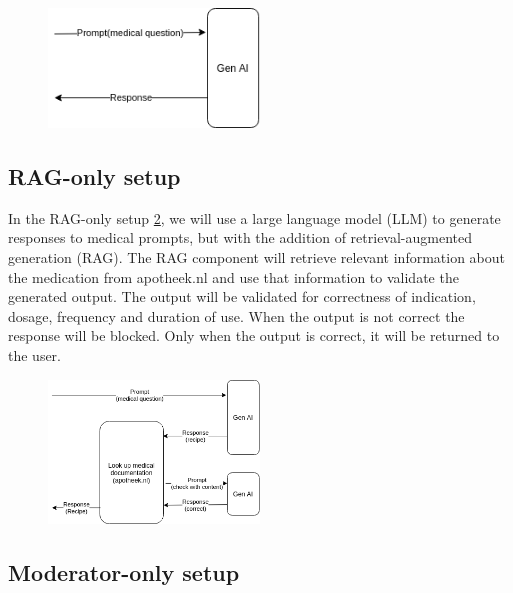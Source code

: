 \begin{figure}
    \includegraphics[width=0.5\textwidth]{figures/baselineSetup.png}
    \label{fig:baselineSetup}
\end{figure}

\subsection{RAG-only setup}

In the RAG-only setup \ref{fig:ragSetup}, we will use a large language model (LLM) to generate responses to medical prompts, but with the addition of retrieval-augmented generation (RAG).
The RAG component will retrieve relevant information about the medication from apotheek.nl and use that information to validate the generated output.
The output will be validated for correctness of indication, dosage, frequency and duration of use.
When the output is not correct the response will be blocked. Only when the output is correct, it will be returned to the user.

\begin{figure}
    \includegraphics[width=0.5\textwidth]{figures/RAGSetup.png}
    \label{fig:ragSetup}
\end{figure}

\subsection{Moderator-only setup}

